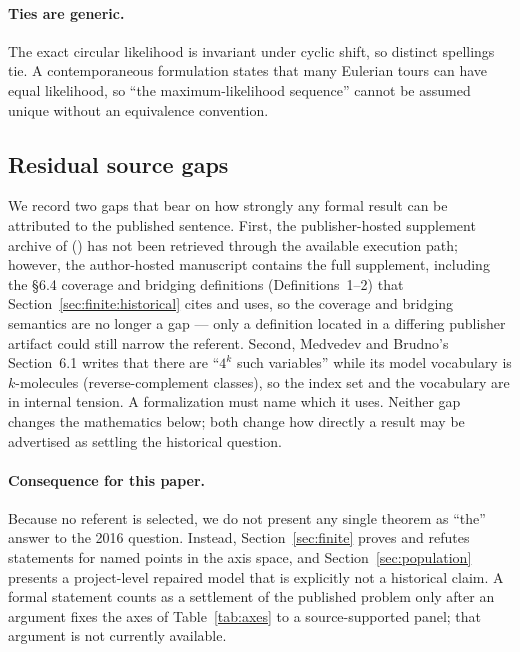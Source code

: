 \paragraph{Ties are generic.}
The exact circular likelihood is invariant under cyclic shift, so distinct
spellings tie. A contemporaneous formulation states that many Eulerian tours can
have equal likelihood, so ``the maximum-likelihood sequence'' cannot be assumed
unique without an equivalence convention.

\subsection{Residual source gaps}

We record two gaps that bear on how strongly any formal result can be attributed
to the published sentence. First, the publisher-hosted supplement archive of
(\cite{shomorony2016}) has not been retrieved through the available execution
path; however, the author-hosted manuscript contains the full supplement,
including the \S6.4 coverage and bridging definitions (Definitions~1--2) that
Section~\ref{sec:finite:historical} cites and uses, so the coverage and bridging
semantics are no longer a gap --- only a definition located in a differing
publisher artifact could still narrow the referent. Second, Medvedev and
Brudno's Section~6.1 writes that there are ``$4^k$ such variables'' while its
model vocabulary is $k$-molecules (reverse-complement classes), so the index set
and the vocabulary are in internal tension. A formalization must name which it
uses. Neither gap changes the mathematics below; both change how directly a
result may be advertised as settling the historical question.

\paragraph{Consequence for this paper.}
Because no referent is selected, we do not present any single theorem as ``the''
answer to the 2016 question. Instead, Section~\ref{sec:finite} proves and refutes
statements for named points in the axis space, and Section~\ref{sec:population}
presents a project-level repaired model that is explicitly not a historical
claim. A formal statement counts as a settlement of the published problem only
after an argument fixes the axes of Table~\ref{tab:axes} to a source-supported
panel; that argument is not currently available.
